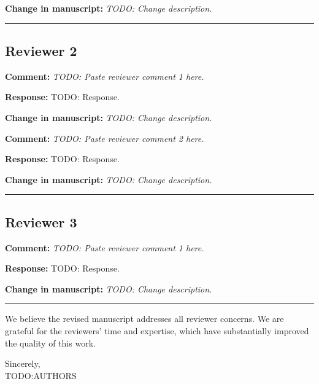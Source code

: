 \documentclass[11pt]{article}
\newcommand{\reviewer}[1]{\subsection*{#1}}
\newcommand{\comment}[1]{%
    \vspace{6pt}
    \noindent\textcolor{reviewercolor}{\textbf{Comment:} \textit{#1}}
    \vspace{4pt}
}
\newcommand{\response}[1]{%
    \noindent\textcolor{responsecolor}{\textbf{Response:}} #1
    \vspace{2pt}
}
\newcommand{\change}[1]{%
    \noindent\textcolor{changecolor}{\textbf{Change in manuscript:}} \textit{#1}
    \vspace{8pt}
}
\begin{document}
\change{TODO: Change description.}

\vspace{6pt}
\noindent\rule{\textwidth}{0.4pt}

\reviewer{Reviewer 2}

\comment{TODO: Paste reviewer comment 1 here.}

\response{TODO: Response.}

\change{TODO: Change description.}


\comment{TODO: Paste reviewer comment 2 here.}

\response{TODO: Response.}

\change{TODO: Change description.}

\vspace{6pt}
\noindent\rule{\textwidth}{0.4pt}

\reviewer{Reviewer 3}

\comment{TODO: Paste reviewer comment 1 here.}

\response{TODO: Response.}

\change{TODO: Change description.}

\vspace{12pt}
\noindent\rule{\textwidth}{0.4pt}

%
%
%

\vspace{12pt}
\noindent We believe the revised manuscript addresses all reviewer concerns. We are grateful for the reviewers' time and expertise, which have substantially improved the quality of this work.

\vspace{12pt}
\noindent Sincerely,\\
TODO:AUTHORS
\end{document}
